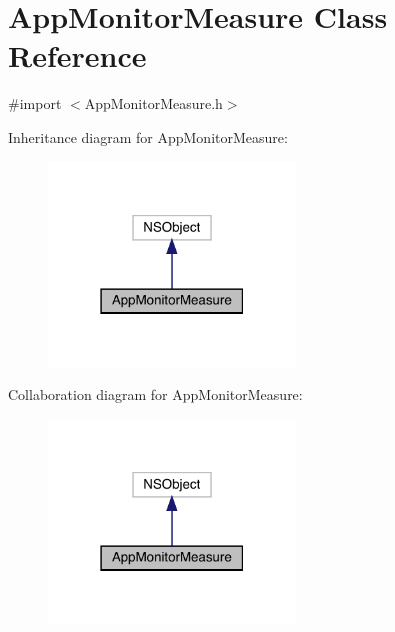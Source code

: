 \hypertarget{interface_app_monitor_measure}{}\section{App\+Monitor\+Measure Class Reference}
\label{interface_app_monitor_measure}


{\ttfamily \#import $<$App\+Monitor\+Measure.\+h$>$}



Inheritance diagram for App\+Monitor\+Measure\+:\nopagebreak
\begin{figure}[H]
\begin{center}
\leavevmode
\includegraphics[width=186pt]{interface_app_monitor_measure__inherit__graph}
\end{center}
\end{figure}


Collaboration diagram for App\+Monitor\+Measure\+:\nopagebreak
\begin{figure}[H]
\begin{center}
\leavevmode
\includegraphics[width=186pt]{interface_app_monitor_measure__coll__graph}
\end{center}
\end{figure}
